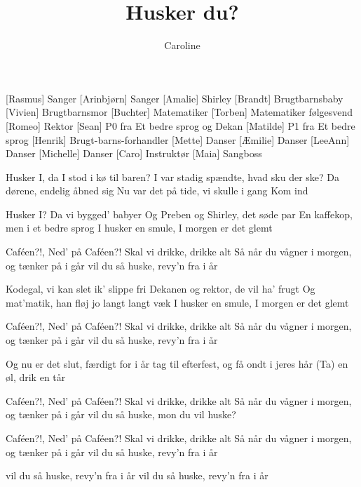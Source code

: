 \documentclass[a4paper,11pt]{article}
\title{Husker du?}
\author{Caroline}
\begin{document}
\maketitle

\begin{roles}
  [Rasmus] Sanger
  [Arinbjørn] Sanger
  [Amalie] Shirley
  [Brandt] Brugtbarnsbaby
  [Vivien] Brugtbarnsmor
  [Buchter] Matematiker
  [Torben] Matematiker følgesvend
  [Romeo] Rektor
  [Sean] P0 fra Et bedre sprog og Dekan
  [Matilde] P1 fra Et bedre sprog
  [Henrik] Brugt-barns-forhandler
  [Mette] Danser
  [Æmilie] Danser
  [LeeAnn] Danser
  [Michelle] Danser
  [Caro] Instruktør
  [Maia] Sangboss
\end{roles}

\begin{song}
%
  Husker I, da I stod i kø til baren?
  I var stadig spændte, hvad sku der ske?
  Da dørene, endelig åbned sig
  Nu var det på tide, vi skulle i gang
  Kom ind

  Husker I? Da vi bygged’ babyer
  Og Preben og Shirley, det søde par
  En kaffekop, men i et bedre sprog
  I husker en smule, I morgen er det glemt
  
  Caféen?!, Ned' på Caféen?!
  Skal vi drikke, drikke alt
  Så når du vågner i morgen, og tænker på i går
  vil du så huske, revy'n fra i år
 
  Kodegal, vi kan slet ik’ slippe fri
  Dekanen og rektor, de vil ha’ frugt
  Og mat’matik, han fløj jo langt langt væk
  I husker en smule, I morgen er det glemt

  Caféen?!, Ned' på Caféen?!
  Skal vi drikke, drikke alt
  Så når du vågner i morgen, og tænker på i går
  vil du så huske, revy'n fra i år

  Og nu er det slut, færdigt for i år
  tag til efterfest, og få ondt i jeres hår
  (Ta) en øl, drik en tår

  Caféen?!, Ned' på Caféen?!
  Skal vi drikke, drikke alt
  Så når du vågner i morgen, og tænker på i går
  vil du så huske, mon du vil huske?

  Caféen?!, Ned' på Caféen?!
  Skal vi drikke, drikke alt
  Så når du vågner i morgen, og tænker på i går
  vil du så huske, revy'n fra i år

  vil du så huske, revy'n fra i år
  vil du så huske, revy'n fra i år


\end{song}
\end{document}
